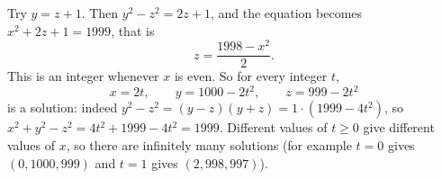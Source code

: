 Try $y=z+1$. Then $y^2-z^2=2z+1$, and the equation becomes $x^2+2z+1=1999$, that is
\[
z=\dfrac{1998-x^2}{2}.
\]
This is an integer whenever $x$ is even. So for every integer $t$,
\[
x=2t,\qquad y=1000-2t^2,\qquad z=999-2t^2
\]
is a solution: indeed $y^2-z^2=(y-z)(y+z)=1\cdot(1999-4t^2)$, so $x^2+y^2-z^2=4t^2+1999-4t^2=1999$. Different values of $t\ge0$ give different values of $x$, so there are infinitely many solutions (for example $t=0$ gives $(0,1000,999)$ and $t=1$ gives $(2,998,997)$).
